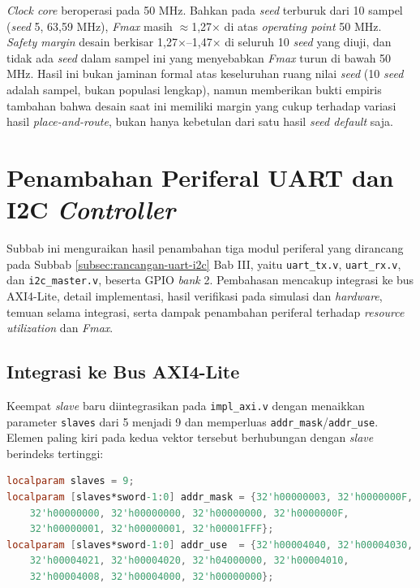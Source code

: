 \textit{Clock core} beroperasi pada 50 MHz. Bahkan pada \textit{seed} terburuk dari 10 sampel (\textit{seed} 5, 63,59 MHz), \textit{Fmax} masih $\approx$1,27$\times$ di atas \textit{operating point} 50 MHz. \textit{Safety margin} desain berkisar 1,27$\times$--1,47$\times$ di seluruh 10 \textit{seed} yang diuji, dan tidak ada \textit{seed} dalam sampel ini yang menyebabkan \textit{Fmax} turun di bawah 50 MHz. Hasil ini bukan jaminan formal atas keseluruhan ruang nilai \textit{seed} (10 \textit{seed} adalah sampel, bukan populasi lengkap), namun memberikan bukti empiris tambahan bahwa desain saat ini memiliki margin yang cukup terhadap variasi hasil \textit{place-and-route}, bukan hanya kebetulan dari satu hasil \textit{seed default} saja.

\section{Penambahan Periferal UART dan I2C \textit{Controller}}
\label{sec:uart-i2c}

Subbab ini menguraikan hasil penambahan tiga modul periferal yang dirancang pada Subbab \ref{subsec:rancangan-uart-i2c} Bab III, yaitu \texttt{uart\_tx.v}, \texttt{uart\_rx.v}, dan \texttt{i2c\_master.v}, beserta GPIO \textit{bank} 2. Pembahasan mencakup integrasi ke bus AXI4-Lite, detail implementasi, hasil verifikasi pada simulasi dan \textit{hardware}, temuan selama integrasi, serta dampak penambahan periferal terhadap \textit{resource utilization} dan \textit{Fmax}.

\subsection{Integrasi ke Bus AXI4-Lite}
\label{subsec:integrasi-uart-i2c}

Keempat \textit{slave} baru diintegrasikan pada \texttt{impl\_axi.v} dengan menaikkan parameter \texttt{slaves} dari 5 menjadi 9 dan memperluas \texttt{addr\_mask}/\texttt{addr\_use}. Elemen paling kiri pada kedua vektor tersebut berhubungan dengan \textit{slave} berindeks tertinggi:

\begin{lstlisting}[language=Verilog]
localparam slaves = 9;
localparam [slaves*sword-1:0] addr_mask = {32'h00000003, 32'h0000000F,
    32'h00000000, 32'h00000000, 32'h00000000, 32'h0000000F,
    32'h00000001, 32'h00000001, 32'h00001FFF};
localparam [slaves*sword-1:0] addr_use  = {32'h00004040, 32'h00004030,
    32'h00004021, 32'h00004020, 32'h04000000, 32'h00004010,
    32'h00004008, 32'h00004000, 32'h00000000};
\end{lstlisting}

